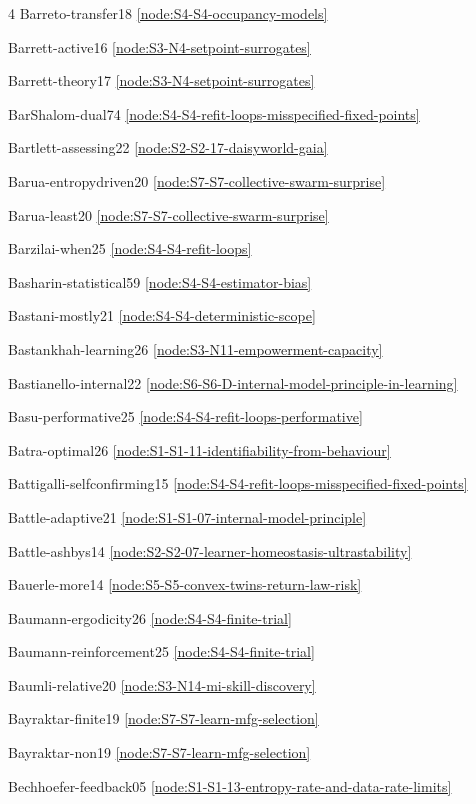 \documentclass[10pt]{article}
\begin{document}
{\begin{multicols}{4}
Barreto-transfer18 \hfill \ref{node:S4-S4-occupancy-models}\par
Barrett-active16 \hfill \ref{node:S3-N4-setpoint-surrogates}\par
Barrett-theory17 \hfill \ref{node:S3-N4-setpoint-surrogates}\par
BarShalom-dual74 \hfill \ref{node:S4-S4-refit-loops-misspecified-fixed-points}\par
Bartlett-assessing22 \hfill \ref{node:S2-S2-17-daisyworld-gaia}\par
Barua-entropydriven20 \hfill \ref{node:S7-S7-collective-swarm-surprise}\par
Barua-least20 \hfill \ref{node:S7-S7-collective-swarm-surprise}\par
Barzilai-when25 \hfill \ref{node:S4-S4-refit-loops}\par
Basharin-statistical59 \hfill \ref{node:S4-S4-estimator-bias}\par
Bastani-mostly21 \hfill \ref{node:S4-S4-deterministic-scope}\par
Bastankhah-learning26 \hfill \ref{node:S3-N11-empowerment-capacity}\par
Bastianello-internal22 \hfill \ref{node:S6-S6-D-internal-model-principle-in-learning}\par
Basu-performative25 \hfill \ref{node:S4-S4-refit-loops-performative}\par
Batra-optimal26 \hfill \ref{node:S1-S1-11-identifiability-from-behaviour}\par
Battigalli-selfconfirming15 \hfill \ref{node:S4-S4-refit-loops-misspecified-fixed-points}\par
Battle-adaptive21 \hfill \ref{node:S1-S1-07-internal-model-principle}\par
Battle-ashbys14 \hfill \ref{node:S2-S2-07-learner-homeostasis-ultrastability}\par
Bauerle-more14 \hfill \ref{node:S5-S5-convex-twins-return-law-risk}\par
Baumann-ergodicity26 \hfill \ref{node:S4-S4-finite-trial}\par
Baumann-reinforcement25 \hfill \ref{node:S4-S4-finite-trial}\par
Baumli-relative20 \hfill \ref{node:S3-N14-mi-skill-discovery}\par
Bayraktar-finite19 \hfill \ref{node:S7-S7-learn-mfg-selection}\par
Bayraktar-non19 \hfill \ref{node:S7-S7-learn-mfg-selection}\par
Bechhoefer-feedback05 \hfill \ref{node:S1-S1-13-entropy-rate-and-data-rate-limits}\par

\end{multicols}}
\end{document}
